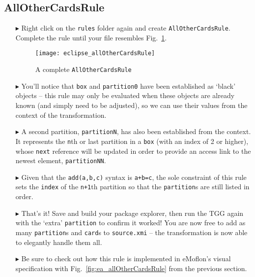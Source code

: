 \newpage
\hypertarget{allCards tex}{}
\subsection{AllOtherCardsRule}
\texHeader

\begin{itemize}

\item[$\blacktriangleright$] Right click on the \texttt{rules} folder again and create \texttt{AllOtherCardsRule}. Complete the rule until your file resembles
Fig.~\ref{fig:eclipse_allOtherCardsRule}.

\vspace{0.5cm}

\begin{figure}[htbp]
\begin{center}
  \texttt{[image: eclipse\_allOtherCardsRule]}
  \caption{A complete \texttt{AllOtherCardsRule}}
  \label{fig:eclipse_allOtherCardsRule}
\end{center}
\end{figure}

\item[$\blacktriangleright$] You'll notice that \texttt{box} and \texttt{partition0} have been established as `black' objects -- this rule may only be evaluated
when these objects are already known (and simply need to be adjusted), so we can use their values from the context of the transformation.

\vspace{0.5cm}

\item[$\blacktriangleright$] A second partition, \texttt{partitionN}, has also been established from the context. It represents the \texttt{n}th or last
partition in a \texttt{box} (with an index of 2 or higher), whose \texttt{next} reference will be updated in order to provide an access
link to the newest element, \texttt{partitionNN}.

\newpage

\item[$\blacktriangleright$] Given that the \texttt{add(a,b,c)} syntax is \texttt{a+b=c}, the sole constraint of this rule sets the \texttt{index} of the
\texttt{n+1}th partition so that the \texttt{partition}s are still listed in order.

\vspace{0.5cm}

\item[$\blacktriangleright$] That's it! Save and build your package explorer, then run the TGG again with the `extra' \texttt{partition} to confirm it worked!
You are now free to add as many \texttt{partition}s and \texttt{card}s to \texttt{source.xmi} -- the transformation is now able to elegantly handle them all.

\vspace{0.5cm}

\item[$\blacktriangleright$] Be sure to check out how this rule is implemented in eMoflon's visual specification with Fig.~\ref{fig:ea_allOtherCardsRule} from
the previous section.

\end{itemize}
